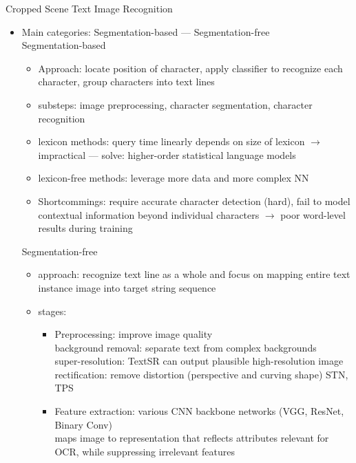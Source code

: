Cropped Scene Text Image Recognition
\begin{itemize}
    \item Main categories: Segmentation-based --- Segmentation-free \\
        Segmentation-based
        \begin{itemize}
            \item Approach: locate position of character, apply classifier to recognize each
                character, group characters into text lines
            \item substeps: image preprocessing, character segmentation, character recognition
            \item lexicon methods: query time linearly depends on size of lexicon
                $\rightarrow$ impractical --- solve: higher-order statistical language models
            \item lexicon-free methods: leverage more data and more complex NN
            \item Shortcommings: require accurate character detection (hard), fail to model contextual
                information beyond individual characters $\rightarrow$ poor word-level results
                during training
        \end{itemize}
        Segmentation-free
        \begin{itemize}
            \item approach: recognize text line as a whole and focus on mapping entire text instance
                image into target string sequence
            \item stages:
                \begin{itemize}
                    \item Preprocessing: improve image quality\\
                        background removal: separate text from complex backgrounds\\
                        super-resolution: TextSR can output plausible high-resolution image\\
                        rectification: remove distortion (perspective and curving shape) STN, TPS
                    \item Feature extraction: various CNN backbone networks (VGG, ResNet, Binary Conv)\\
                        maps image to representation that reflects attributes relevant for OCR, while
                        suppressing irrelevant features\\

\end{itemize}
\end{itemize}
\end{itemize}
